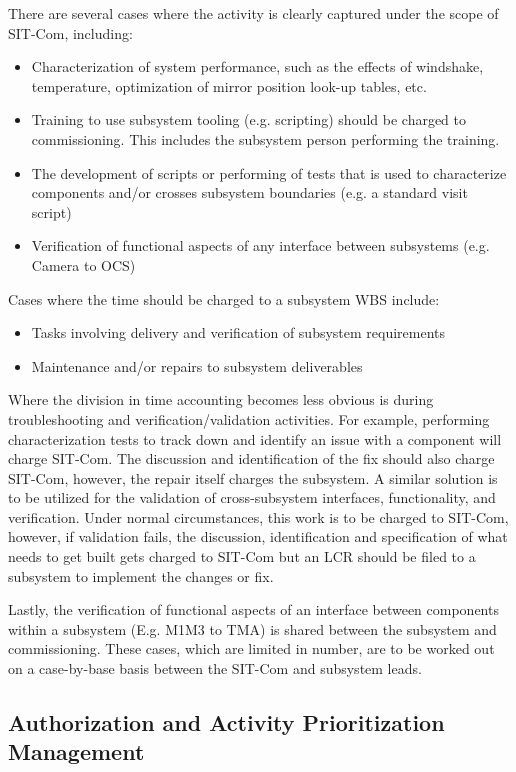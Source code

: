 \documentclass[SE,lsstdraft,authoryear,toc]{lsstdoc}
\begin{document}
There are several cases where the activity is clearly captured under the scope of SIT-Com, including:
\begin{itemize}
    \item Characterization of system performance, such as the effects of windshake, temperature, optimization of mirror position look-up tables, etc.
    \item Training to use subsystem tooling (e.g. scripting) should be charged to commissioning.
    This includes the subsystem person performing the training.
    \item The development of scripts or performing of tests that is used to characterize components and/or crosses subsystem boundaries (e.g. a standard visit script)
    \item Verification of functional aspects of any interface between subsystems (e.g. Camera to OCS)
\end{itemize}

Cases where the time should be charged to a subsystem WBS include:
\begin{itemize}
    \item Tasks involving delivery and verification of subsystem requirements
    \item Maintenance and/or repairs to subsystem deliverables
\end{itemize}

Where the division in time accounting becomes less obvious is during troubleshooting and verification/validation activities.
For example, performing characterization tests to track down and identify an issue with a component will charge SIT-Com.
The discussion and identification of the fix should also charge SIT-Com, however, the repair itself charges the subsystem.
A similar solution is to be utilized for the validation of cross-subsystem interfaces, functionality, and verification.
Under normal circumstances, this work is to be charged to SIT-Com, however, if validation fails, the discussion, identification and specification of what needs to get built gets charged to SIT-Com but an LCR should be filed to a subsystem to implement the changes or fix.

Lastly, the verification of functional aspects of an interface between components within a subsystem (E.g. M1M3 to TMA) is shared between the subsystem and commissioning.
These cases, which are limited in number, are to be worked out on a case-by-base basis between the SIT-Com and subsystem leads.

\subsection{Authorization and Activity Prioritization Management}
\end{document}
